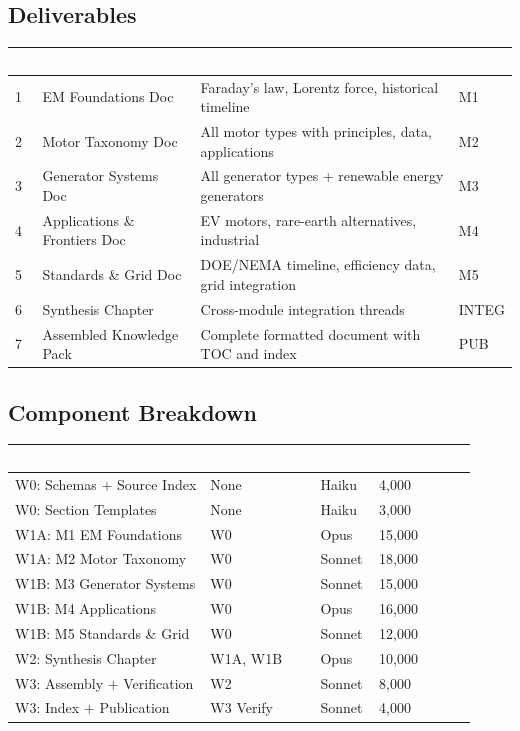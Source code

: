 \documentclass[11pt,letterpaper]{article}
\newcommand{\tableheader}[1]{\textbf{\sffamily\textcolor{white}{#1}}}
\begin{document}
\subsection{Deliverables}

\begin{center}
\begin{tabularx}{\textwidth}{C{0.5cm}L{3.5cm}XC{1.5cm}}
\toprule
{}
\tableheader{\#} & \tableheader{Deliverable} & \tableheader{Acceptance Criteria} & \tableheader{Spec} \\
 & EM Foundations Doc & Faraday's law, Lorentz force, historical timeline & M1 \\
2 & Motor Taxonomy Doc & All motor types with principles, data, applications & M2 \\
3 & Generator Systems Doc & All generator types + renewable energy generators & M3 \\
4 & Applications \& Frontiers Doc & EV motors, rare-earth alternatives, industrial & M4 \\
5 & Standards \& Grid Doc & DOE/NEMA timeline, efficiency data, grid integration & M5 \\
6 & Synthesis Chapter & Cross-module integration threads & INTEG \\
7 & Assembled Knowledge Pack & Complete formatted document with TOC and index & PUB \\
\bottomrule
\end{tabularx}
\end{center}

\subsection{Component Breakdown}

\begin{center}
\begin{tabularx}{\textwidth}{L{3.5cm}C{2cm}C{1.5cm}C{2cm}}
\toprule
{}
\tableheader{Component} & \tableheader{Dependencies} & \tableheader{Model} & \tableheader{Est.\ Tokens} \\
\midrule
W0: Schemas + Source Index & None & Haiku & 4,000 \\
W0: Section Templates & None & Haiku & 3,000 \\
W1A: M1 EM Foundations & W0 & Opus & 15,000 \\
W1A: M2 Motor Taxonomy & W0 & Sonnet & 18,000 \\
W1B: M3 Generator Systems & W0 & Sonnet & 15,000 \\
W1B: M4 Applications & W0 & Opus & 16,000 \\
W1B: M5 Standards \& Grid & W0 & Sonnet & 12,000 \\
W2: Synthesis Chapter & W1A, W1B & Opus & 10,000 \\
W3: Assembly + Verification & W2 & Sonnet & 8,000 \\
W3: Index + Publication & W3 Verify & Sonnet & 4,000 \\
\bottomrule
\end{tabularx}
\end{center}
\end{document}
